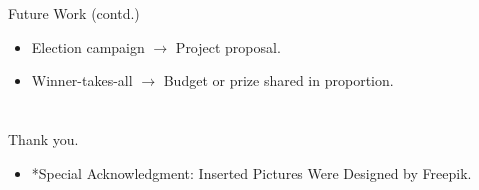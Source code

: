 \documentclass[xcolor=dvipsnames,envcountsect]{beamer}
\begin{document}
\begin{frame}{Future Work (contd.)}
	\begin{itemize}
		\item Election campaign $\rightarrow$ Project proposal. 
		\vspace{6pt}
		\item Winner-takes-all $\rightarrow$ Budget or prize shared in proportion. 
	\end{itemize}	
\end{frame}


\iffalse
\begin{frame}
\begin{figure}
	\begin{center}
		\texttt{[image: eps/handwritten.eps]}
	\end{center}
\end{figure}
\end{frame}    
\fi


\section*{}


\begin{frame}
\frametitle{}
\vspace{1.8cm}
\begin{center}
{\Huge Thank you.}
\end{center}
\vspace{1.0cm}
\begin{scriptsize}
\begin{center}
\begin{itemize}
\item [] *Special Acknowledgment: Inserted Pictures Were Designed by Freepik.
\end{itemize}
\end{center}
\end{scriptsize}
\end{frame}
\end{document}
